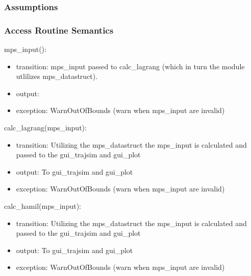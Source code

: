 \documentclass[12pt, titlepage]{article}
\begin{document}
\subsubsection{Assumptions}


\subsubsection{Access Routine Semantics}

\noindent mps\_input():
\begin{itemize}
\item transition: mps\_input passed to calc\_lagrang (which in turn the module utlilizes mps\_datastruct).
\item output:  
\item exception: WarnOutOfBounds (warn when mps\_input are invalid)  
\end{itemize}

\noindent calc\_lagrang(mps\_input):
\begin{itemize}
\item transition: Utilizing the mps\_datastruct the mps\_input is calculated and passed to the gui\_trajsim and gui\_plot  
\item output: To gui\_trajsim and gui\_plot  
\item exception: WarnOutOfBounds (warn when mps\_input are invalid)  
\end{itemize}

\noindent calc\_hamil(mps\_input):
\begin{itemize}
\item transition: Utilizing the mps\_datastruct the mps\_input is calculated and passed to the gui\_trajsim and gui\_plot  
\item output: To gui\_trajsim and gui\_plot  
\item exception: WarnOutOfBounds (warn when mps\_input are invalid)  
\end{itemize}

\end{document}
